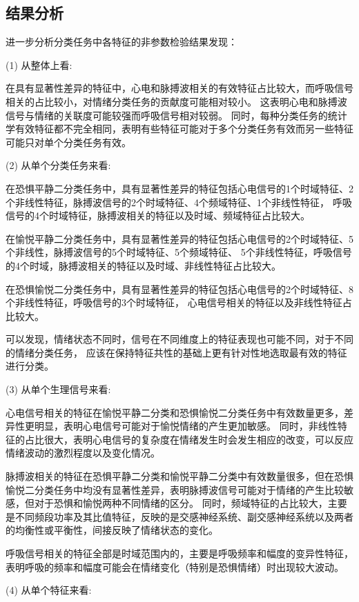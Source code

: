 \subsection{结果分析}
进一步分析分类任务中各特征的非参数检验结果发现：

(1) 从整体上看: 

在具有显著性差异的特征中，心电和脉搏波相关的有效特征占比较大，而呼吸信号相关的占比较小，对情绪分类任务的贡献度可能相对较小。
这表明心电和脉搏波信号与情绪的关联度可能较强而呼吸信号相对较弱。
同时，每种分类任务的统计学有效特征都不完全相同，表明有些特征可能对于多个分类任务有效而另一些特征可能只对单个分类任务有效。

(2) 从单个分类任务来看: 

在恐惧平静二分类任务中，具有显著性差异的特征包括心电信号的1个时域特征、2个非线性特征，脉搏波信号的2个时域特征、4个频域特征、1个非线性特征，
呼吸信号的4个时域特征，脉搏波相关的特征以及时域、频域特征占比较大。

在愉悦平静二分类任务中，具有显著性差异的特征包括心电信号的2个时域特征、5个非线性，脉搏波信号的5个时域特征、5个频域特征、
5个非线性特征，呼吸信号的4个时域，脉搏波相关的特征以及时域、非线性特征占比较大。

在恐惧愉悦二分类任务中，具有显著性差异的特征包括心电信号的2个时域特征、8个非线性特征，呼吸信号的3个时域特征，
心电信号相关的特征以及非线性特征占比较大。

可以发现，情绪状态不同时，信号在不同维度上的特征表现也可能不同，对于不同的情绪分类任务，
应该在保持特征共性的基础上更有针对性地选取最有效的特征进行分类。

(3) 从单个生理信号来看: 

心电信号相关的特征在愉悦平静二分类和恐惧愉悦二分类任务中有效数量更多，差异性更明显，表明心电信号可能对于愉悦情绪的产生更加敏感。
同时，非线性特征的占比很大，表明心电信号的复杂度在情绪发生时会发生相应的改变，可以反应情绪波动的激烈程度以及变化情况。

脉搏波相关的特征在恐惧平静二分类和愉悦平静二分类中有效数量很多，但在恐惧愉悦二分类任务中均没有显著性差异，表明脉搏波信号可能对于情绪的产生比较敏感，但对于恐惧和愉悦两种不同情绪的区分。
同时，频域特征的占比较大，主要是不同频段功率及其比值特征，反映的是交感神经系统、副交感神经系统以及两者的均衡性或平衡性，间接反映了情绪状态的变化。 

呼吸信号相关的特征全部是时域范围内的，主要是呼吸频率和幅度的变异性特征，
表明呼吸的频率和幅度可能会在情绪变化（特别是恐惧情绪）时出现较大波动。 

(4) 从单个特征来看: 

